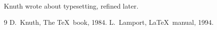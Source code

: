 \documentclass{article}
\begin{document}
Knuth wrote about typesetting\cite{knuth84}, refined later\cite{lamport94}.
\begin{thebibliography}{9}
 D.~Knuth, The \TeX\ book, 1984.
 L.~Lamport, \LaTeX\ manual, 1994.
\end{thebibliography}
\end{document}

